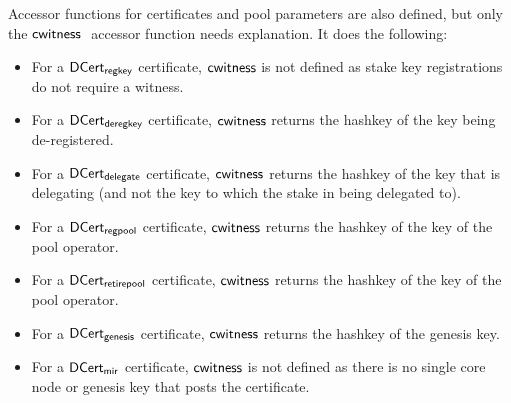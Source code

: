 Accessor functions for certificates and pool parameters are also defined, but
only the $\mathsf{cwitness}~ \mathit{}$ accessor function needs explanation.
It does the following:
\begin{itemize}
  \item For a $\mathsf{DCert_{regkey}}$ certificate, $\mathsf{cwitness}$ is not defined as
  stake key registrations do not require a witness.
\item For a $\mathsf{DCert_{deregkey}}$ certificate, $\mathsf{cwitness}$ returns the hashkey
  of the key being de-registered.
\item For a $\mathsf{DCert_{delegate}}$ certificate, $\mathsf{cwitness}$ returns the hashkey
  of the key that is delegating (and not the key to which the stake in being delegated to).
\item For a $\mathsf{DCert_{regpool}}$ certificate, $\mathsf{cwitness}$ returns the hashkey
  of the key of the pool operator.
\item For a $\mathsf{DCert_{retirepool}}$ certificate, $\mathsf{cwitness}$ returns the hashkey
  of the key of the pool operator.
\item For a $\mathsf{DCert_{genesis}}$ certificate, $\mathsf{cwitness}$ returns the hashkey
  of the genesis key.
\item For a $\mathsf{DCert_{mir}}$ certificate, $\mathsf{cwitness}$ is not defined as there is
  no single core node or genesis key that posts the certificate.
\end{itemize}

